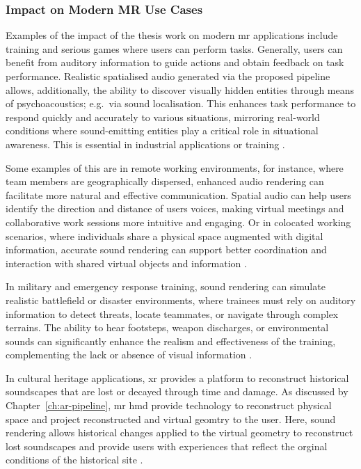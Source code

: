\subsubsection{Impact on Modern MR Use Cases}
Examples of the impact of the thesis work on modern \acrshort{mr} applications include training and serious games where users can perform tasks. Generally, users can benefit from auditory information to guide actions and obtain feedback on task performance. Realistic spatialised audio generated via the proposed pipeline allows, additionally, the ability to discover visually hidden entities through means of psychoacoustics; e.g.\ via sound localisation. This enhances task performance to respond quickly and accurately to various situations, mirroring real-world conditions where sound-emitting entities play a critical role in situational awareness. This is essential in industrial applications \citep{machala2022application} or training \citep{soltani2020augmented}.\par
Some examples of this are in remote working environments, for instance, where team members are geographically dispersed, enhanced audio rendering can facilitate more natural and effective communication. Spatial audio can help users identify the direction and distance of users voices, making virtual meetings and collaborative work sessions more intuitive and engaging. Or in colocated working scenarios, where individuals share a physical space augmented with digital information, accurate sound rendering can support better coordination and interaction with shared virtual objects and information \citep{park2022metaverse,al2022review}.\par
In military and emergency response training, sound rendering can simulate realistic battlefield or disaster environments, where trainees must rely on auditory information to detect threats, locate teammates, or navigate through complex terrains. The ability to hear footsteps, weapon discharges, or environmental sounds can significantly enhance the realism and effectiveness of the training, complementing the lack or absence of visual information \citep{vine2023training, ahir2020application}.\par
In cultural heritage applications, \acrshort{xr} provides a platform to reconstruct historical soundscapes that are lost or decayed through time and damage. As discussed by Chapter~\ref{ch:ar-pipeline}, \acrshort{mr} \acrshort{hmd} provide technology to reconstruct physical space and project reconstructed and virtual geomtry to the user. Here, sound rendering allows historical changes applied to the virtual geometry to reconstruct lost soundscapes and provide users with experiences that reflect the orginal conditions of the historical site \citep{katz2020past, schofield2018viking}.

